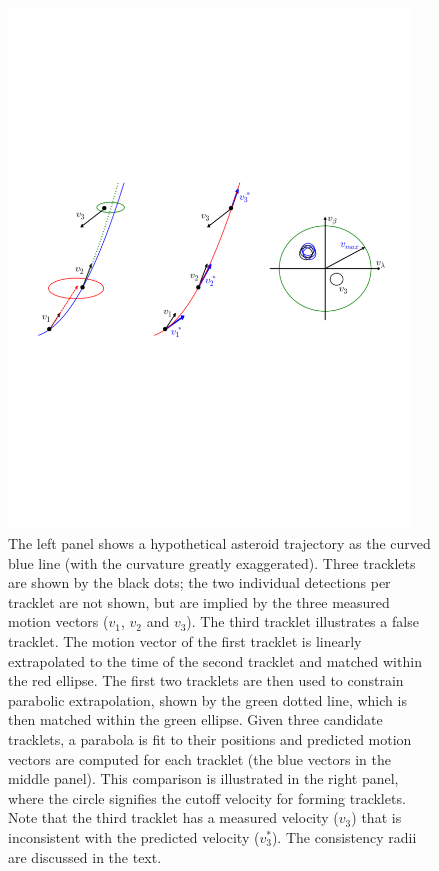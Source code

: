 \begin{figure}[th!]
\centering
\vskip -2.6in
\includegraphics[width=0.95\textwidth]{figures/TrackSlide1}
\vskip -2.7in
\caption{The left panel shows a hypothetical asteroid trajectory as the curved blue line (with
the curvature greatly exaggerated). Three tracklets are shown by the black dots; the
two individual detections per tracklet are not shown, but are implied by the three measured
motion vectors ($v_1$, $v_2$ and $v_3$). The third tracklet illustrates a false tracklet.
The motion vector of the first tracklet is linearly extrapolated to the time of the second
tracklet and matched within the red ellipse. The first two tracklets are then used to
constrain parabolic extrapolation, shown by the green dotted line, which is then matched
within the green ellipse. Given three candidate tracklets, a parabola is fit to their positions
and predicted motion vectors are computed for each tracklet (the blue vectors in the middle
panel). This comparison is illustrated in the right panel, where the circle signifies the cutoff
velocity for forming tracklets. Note that the third tracklet has a measured velocity ($v_3$)
that is inconsistent with the predicted velocity ($v_3^\ast$). The consistency radii are discussed
in the text.
\label{fig:TrackSlide1}}
\end{figure}

